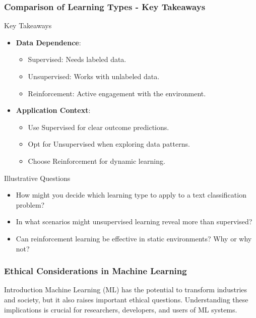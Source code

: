 \documentclass[aspectratio=169]{beamer}
\begin{document}
\begin{frame}[fragile]
    \frametitle{Comparison of Learning Types - Key Takeaways}
    \begin{block}{Key Takeaways}
        \begin{itemize}
            \item \textbf{Data Dependence}:
            \begin{itemize}
                \item Supervised: Needs labeled data.
                \item Unsupervised: Works with unlabeled data.
                \item Reinforcement: Active engagement with the environment.
            \end{itemize}
            \item \textbf{Application Context}:
            \begin{itemize}
                \item Use Supervised for clear outcome predictions.
                \item Opt for Unsupervised when exploring data patterns.
                \item Choose Reinforcement for dynamic learning.
            \end{itemize}
        \end{itemize}
    \end{block}
    
    \begin{block}{Illustrative Questions}
        \begin{itemize}
            \item How might you decide which learning type to apply to a text classification problem?
            \item In what scenarios might unsupervised learning reveal more than supervised?
            \item Can reinforcement learning be effective in static environments? Why or why not?
        \end{itemize}
    \end{block}
\end{frame}

\begin{frame}[fragile]
    \frametitle{Ethical Considerations in Machine Learning}
    \begin{block}{Introduction}
        Machine Learning (ML) has the potential to transform industries and society, but it also raises important ethical questions.
        Understanding these implications is crucial for researchers, developers, and users of ML systems.
    \end{block}
\end{frame}
\end{document}
